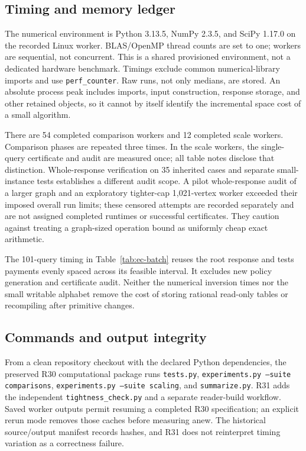 \subsection{Timing and memory ledger}
The numerical environment is Python 3.13.5, NumPy 2.3.5, and SciPy 1.17.0 on the recorded Linux worker. BLAS/OpenMP thread counts are set to one; workers are sequential, not concurrent. This is a shared provisioned environment, not a dedicated hardware benchmark. Timings exclude common numerical-library imports and use \texttt{perf\_counter}. Raw runs, not only medians, are stored. An absolute process peak includes imports, input construction, response storage, and other retained objects, so it cannot by itself identify the incremental space cost of a small algorithm.

There are 54 completed comparison workers and 12 completed scale workers. Comparison phases are repeated three times. In the scale workers, the single-query certificate and audit are measured once; all table notes disclose that distinction. Whole-response verification on 35 inherited cases and separate small-instance tests establishes a different audit scope. A pilot whole-response audit of a larger graph and an exploratory tighter-cap 1,021-vertex worker exceeded their imposed overall run limits; these censored attempts are recorded separately and are not assigned completed runtimes or successful certificates. They caution against treating a graph-sized operation bound as uniformly cheap exact arithmetic.

The 101-query timing in Table~\ref{tab:ec-batch} reuses the root response and tests payments evenly spaced across its feasible interval. It excludes new policy generation and certificate audit. Neither the numerical inversion times nor the small writable alphabet remove the cost of storing rational read-only tables or recompiling after primitive changes.

\subsection{Commands and output integrity}
From a clean repository checkout with the declared Python dependencies, the preserved R30 computational package runs \texttt{tests.py}, \texttt{experiments.py --suite comparisons}, \texttt{experiments.py --suite scaling}, and \texttt{summarize.py}. R31 adds the independent \texttt{tightness\_check.py} and a separate reader-build workflow. Saved worker outputs permit resuming a completed R30 specification; an explicit rerun mode removes those caches before measuring anew. The historical source/output manifest records hashes, and R31 does not reinterpret timing variation as a correctness failure.
